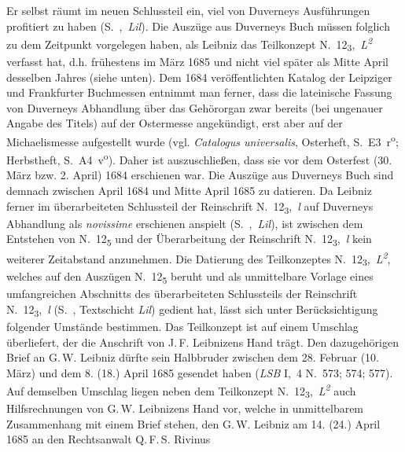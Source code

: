Er selbst räumt im neuen Schlussteil %
ein, viel von Duverneys Ausführungen profitiert zu haben (S.~,~\textit{Lil}).
Die Auszüge aus Duverneys Buch müssen folglich zu dem Zeit\-punkt vorgelegen haben, als Leibniz das Teilkonzept N.~12\textsubscript{3},~\textit{L\textsuperscript{2}} verfasst hat, d.h. frühestens im März 1685 und nicht viel später als Mitte April desselben Jahres (siehe unten).
Dem 1684 veröffentlichten Katalog der Leipziger und Frankfurter Buchmessen entnimmt man ferner, dass die lateinische Fassung von Duverneys Abhandlung über das Gehörorgan zwar bereits (bei ungenauer Angabe des Titels) auf der Ostermesse angekündigt, erst aber auf der Michaelismesse aufgestellt wurde (vgl. \textit{Catalogus universalis}, Osterheft, S.~E3~r\textsuperscript{o}; Herbstheft, S.~A4~v\textsuperscript{o}).\cite{01244}
Daher ist auszuschließen, dass sie vor dem Osterfest (30. März bzw. 2. April) 1684 erschienen war.
Die Aus\-züge aus Duverneys Buch sind demnach zwischen April 1684 und Mitte April 1685 zu datieren.
Da Leibniz ferner im überarbeiteten Schluss\-teil der Reinschrift N.~12\textsubscript{3},~\textit{l} %
auf Duverneys Abhandlung als \textit{novissime} erschienen anspielt (S.~,~\textit{Lil}), ist zwischen dem Entstehen von N.~12\textsubscript{5} und der Überarbeitung der Reinschrift N.~12\textsubscript{3},~\textit{l} kein weiterer Zeitabstand anzunehmen.
\pend
\pstart%
Die Datierung des Teilkonzeptes N.~12\textsubscript{3},~\textit{L\textsuperscript{2}}, welches auf den Auszügen N.~12\textsubscript{5} beruht und als unmittelbare Vorlage eines umfangreichen Abschnitts des überarbeiteten Schlussteils der Reinschrift N.~12\textsubscript{3},~\textit{l} (S.~, Textschicht \textit{Lil}) gedient hat, lässt sich unter Berücksichtigung folgender Umstände bestimmen.
Das Teilkonzept ist auf einem Umschlag überliefert, der die Anschrift von J.\,F. Leibnizens Hand trägt.\protect{}
Den dazugehörigen Brief an G.\,W. Leibniz dürfte sein Halbbruder zwischen dem 28. Februar (10. März) und dem 8. (18.) April 1685 gesendet haben (\textit{LSB} I,~4 N.~573;\cite{01319} 574;\cite{01320} 577\cite{01321}).
Auf demselben Umschlag liegen neben dem Teilkonzept N.~12\textsubscript{3},~\textit{L\textsuperscript{2}} auch Hilfsrechnungen von G.\,W. Leibnizens Hand vor, welche in unmittelbarem Zusammenhang mit einem Brief stehen, den G.\,W. Leibniz am 14. (24.) April 1685 an den Rechtsanwalt Q.\,F.\,S. Rivinus\protect{} 
